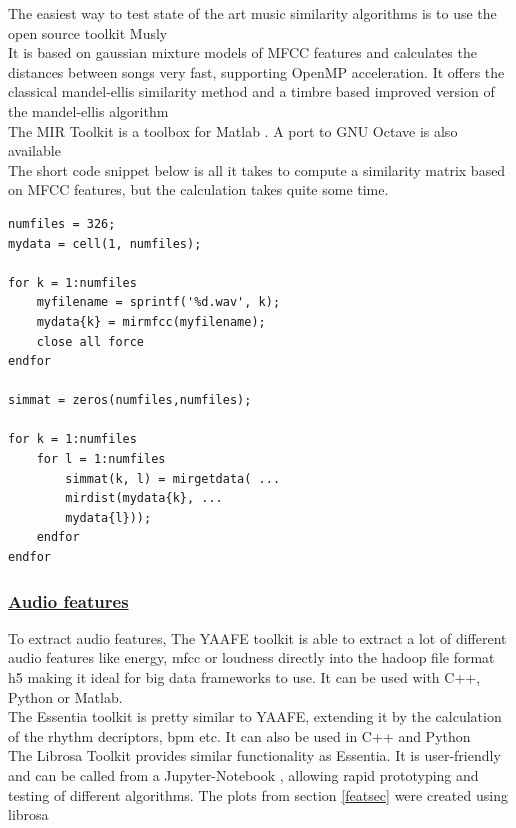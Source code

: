 The easiest way to test state of the art music similarity algorithms is to use the open source toolkit Musly \cite{musly1}\\ 
It is based on gaussian mixture models of MFCC features and calculates the distances between songs very fast, supporting OpenMP acceleration. It offers the classical mandel-ellis similarity method \cite{mandelellis1} and a timbre based improved version of the mandel-ellis algorithm \cite{musly2}\\
The MIR Toolkit \cite{mirtoolbox1} is a toolbox for Matlab \cite{matl1}. A port to GNU Octave \cite{octave1} is also available \cite{mirtoolbox2}\\
The short code snippet below is all it takes to compute a similarity matrix based on MFCC features, but the calculation takes quite some time.

\lstset{language=Matlab}          %

\FloatBarrier

\begin{lstlisting}[frame=single]  % Start your code-block
numfiles = 326;
mydata = cell(1, numfiles);

for k = 1:numfiles
	myfilename = sprintf('%d.wav', k);
	mydata{k} = mirmfcc(myfilename);
	close all force
endfor

simmat = zeros(numfiles,numfiles);

for k = 1:numfiles
	for l = 1:numfiles
		simmat(k, l) = mirgetdata( ...
		mirdist(mydata{k}, ...
		mydata{l}));
	endfor
endfor
\end{lstlisting}

\FloatBarrier

\subsubsection{\underline{Audio features}}
To extract audio features, 
The YAAFE toolkit \cite{yaafe1} is able to extract a lot of different audio features like energy, mfcc or loudness directly into the hadoop file format h5 making it ideal for big data frameworks to use. It can be used with C++, Python or Matlab.\\
The Essentia toolkit \cite{essentia1} is pretty similar to YAAFE, extending it by the calculation of the rhythm decriptors, bpm etc. It can also be used in C++ and Python\\
The Librosa Toolkit provides similar functionality \cite{labrosa1} as Essentia. It is user-friendly and can be called from a Jupyter-Notebook \cite{jupyter}, allowing rapid prototyping and testing of different algorithms. The plots from section \ref{featsec} were created using librosa\\

